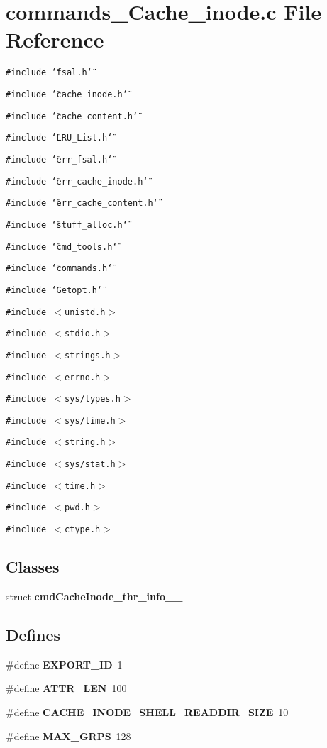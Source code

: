 \section{commands\_\-Cache\_\-inode.c File Reference}
\label{commands__Cache__inode_8c}
{\tt \#include \char`\"{}fsal.h\char`\"{}}\par
{\tt \#include \char`\"{}cache\_\-inode.h\char`\"{}}\par
{\tt \#include \char`\"{}cache\_\-content.h\char`\"{}}\par
{\tt \#include \char`\"{}LRU\_\-List.h\char`\"{}}\par
{\tt \#include \char`\"{}err\_\-fsal.h\char`\"{}}\par
{\tt \#include \char`\"{}err\_\-cache\_\-inode.h\char`\"{}}\par
{\tt \#include \char`\"{}err\_\-cache\_\-content.h\char`\"{}}\par
{\tt \#include \char`\"{}stuff\_\-alloc.h\char`\"{}}\par
{\tt \#include \char`\"{}cmd\_\-tools.h\char`\"{}}\par
{\tt \#include \char`\"{}commands.h\char`\"{}}\par
{\tt \#include \char`\"{}Getopt.h\char`\"{}}\par
{\tt \#include $<$unistd.h$>$}\par
{\tt \#include $<$stdio.h$>$}\par
{\tt \#include $<$strings.h$>$}\par
{\tt \#include $<$errno.h$>$}\par
{\tt \#include $<$sys/types.h$>$}\par
{\tt \#include $<$sys/time.h$>$}\par
{\tt \#include $<$string.h$>$}\par
{\tt \#include $<$sys/stat.h$>$}\par
{\tt \#include $<$time.h$>$}\par
{\tt \#include $<$pwd.h$>$}\par
{\tt \#include $<$ctype.h$>$}\par
\subsection*{Classes}
\begin{CompactItemize}
\item 
struct {\bf cmdCacheInode\_\-thr\_\-info\_\-\_\-}
\end{CompactItemize}
\subsection*{Defines}
\begin{CompactItemize}
\item 
\#define {\bf EXPORT\_\-ID}~1
\item 
\#define {\bf ATTR\_\-LEN}~100
\item 
\#define {\bf CACHE\_\-INODE\_\-SHELL\_\-READDIR\_\-SIZE}~10
\item 
\#define {\bf MAX\_\-GRPS}~128
\end{CompactItemize}
